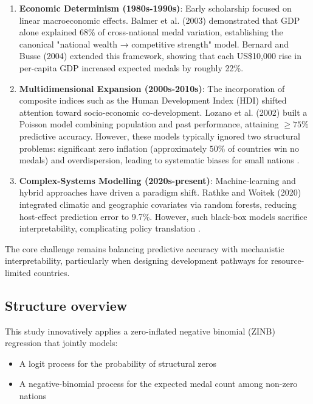 \documentclass[11pt,twoside]{article}
\numberwithin{Theorem}{section}
\numberwithin{Definition}{section}
\numberwithin{Lemma}{section}
\numberwithin{Algorithm}{section}
\numberwithin{equation}{section}
\begin{document}
\begin{enumerate}
    \item \textbf{Economic Determinism (1980s-1990s)}: 
    Early scholarship focused on linear macroeconomic effects. Balmer et al. (2003) demonstrated that GDP alone explained 68\% of cross-national medal variation, establishing the canonical "national wealth → competitive strength" model. Bernard and Busse (2004) extended this framework, showing that each US\$10,000 rise in per-capita GDP increased expected medals by roughly 22\%.
    
    \item \textbf{Multidimensional Expansion (2000s-2010s)}: 
    The incorporation of composite indices such as the Human Development Index (HDI) shifted attention toward socio-economic co-development. Lozano et al. (2002) built a Poisson model combining population and past performance, attaining $\geq75\%$ predictive accuracy. However, these models typically ignored two structural problems: significant zero inflation (approximately $50\%$ of countries win no medals) and overdispersion, leading to systematic biases for small nations \cite{kuper2003}.
    
    \item \textbf{Complex-Systems Modelling (2020s-present)}: 
    Machine-learning and hybrid approaches have driven a paradigm shift. Rathke and Woitek (2020) integrated climatic and geographic covariates via random forests, reducing host-effect prediction error to 9.7\%. However, such black-box models sacrifice interpretability, complicating policy translation \cite{andreff2021}.
\end{enumerate}

The core challenge remains balancing predictive accuracy with mechanistic interpretability, particularly when designing development pathways for resource-limited countries.

\subsection{Structure overview}
\label{subsec:methodology}

This study innovatively applies a zero-inflated negative binomial (ZINB) regression that jointly models:
\begin{itemize}
    \item A logit process for the probability of structural zeros
    \item A negative-binomial process for the expected medal count among non-zero nations \cite{greene1994}
\end{itemize}
\end{document}
